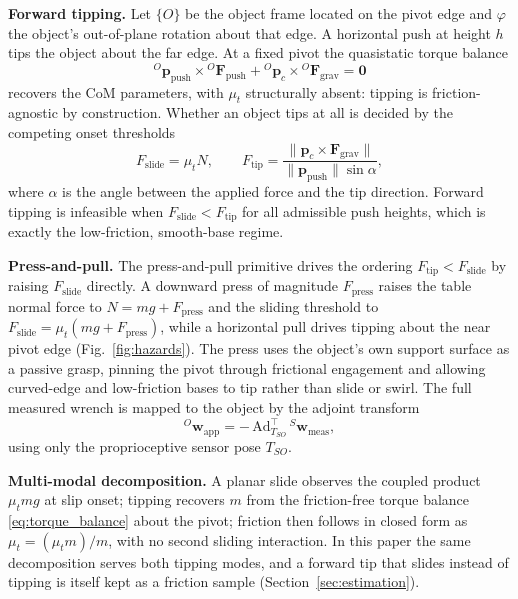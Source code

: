 \documentclass[10pt, conference]{IEEEtran}
\begin{document}
\noindent \textbf{Forward tipping.} Let $\{O\}$ be the object frame located on the pivot edge and $\varphi$ the object's out-of-plane rotation about that edge. A horizontal push at height $h$ tips the object about the far edge. At a fixed pivot the quasistatic torque balance
\begin{equation}
    {}^{O}\mathbf{p}_{\mathrm{push}}\times{}^{O}\mathbf{F}_{\mathrm{push}}
    + {}^{O}\mathbf{p}_{c}\times{}^{O}\mathbf{F}_{\mathrm{grav}} = \mathbf{0}
    \label{eq:torque_balance}
\end{equation}
recovers the CoM parameters, with $\mu_t$ structurally absent: tipping is friction-agnostic by construction. Whether an object tips at all is decided by the competing onset thresholds
\begin{equation}
  F_{\mathrm{slide}} = \mu_t N, \qquad
    F_{\mathrm{tip}} = \frac{\lVert \mathbf{p}_c\times\mathbf{F}_{\mathrm{grav}}\rVert}
                            {\lVert\mathbf{p}_{\mathrm{push}}\rVert \sin\alpha},
    \label{eq:thresholds}
\end{equation}
where $\alpha$ is the angle between the applied force and the tip direction. Forward tipping is infeasible when $F_{\mathrm{slide}} < F_{\mathrm{tip}}$ for all admissible push heights, which is exactly the low-friction, smooth-base regime.

\noindent \textbf{Press-and-pull.} The press-and-pull primitive drives the ordering $F_{\mathrm{tip}} < F_{\mathrm{slide}}$ by raising $F_{\mathrm{slide}}$ directly. A downward press of magnitude $F_{\mathrm{press}}$ raises the table normal force to $N = mg + F_{\mathrm{press}}$ and the sliding threshold to $F_{\mathrm{slide}} = \mu_t(mg + F_{\mathrm{press}})$, while a horizontal pull drives tipping about the near pivot edge (Fig.~\ref{fig:hazards}). The press uses the object's own support surface as a passive grasp, pinning the pivot through frictional engagement and allowing curved-edge and low-friction bases to tip rather than slide or swirl. The full measured wrench is mapped to the object by the adjoint transform
\begin{equation}
    {}^{O}\mathbf{w}_{\mathrm{app}} = -\,\mathrm{Ad}^{\!\top}_{T_{SO}}\,{}^{S}\mathbf{w}_{\mathrm{meas}},
    \label{eq:adjoint}
\end{equation}
using only the proprioceptive sensor pose $T_{SO}$.

\noindent \textbf{Multi-modal decomposition.} A planar slide observes the coupled product $\mu_t m g$ at slip onset; tipping recovers $m$ from the friction-free torque balance \eqref{eq:torque_balance} about the pivot; friction then follows in closed form as $\mu_t = (\mu_t m)/m$, with no second sliding interaction. In this paper the same decomposition serves both tipping modes, and a forward tip that slides instead of tipping is itself kept as a friction sample (Section~\ref{sec:estimation}).
\end{document}

